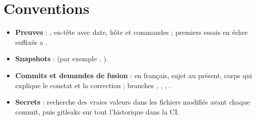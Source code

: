 \section{Conventions}

\begin{itemize}
  \item \textbf{Preuves} : , en-tête avec date, hôte
        et commandes ; premiers essais en échec suffixés \og a \fg{}.
  \item \textbf{Snapshots} :  (par exemple ,
        ).
  \item \textbf{Commits et demandes de fusion} : en français, sujet au présent, corps qui explique le
        constat et la correction ; branches , , , .
  \item \textbf{Secrets} : recherche des vraies valeurs dans les fichiers modifiés avant chaque commit,
        puis gitleaks sur tout l'historique dans la CI.
\end{itemize}
